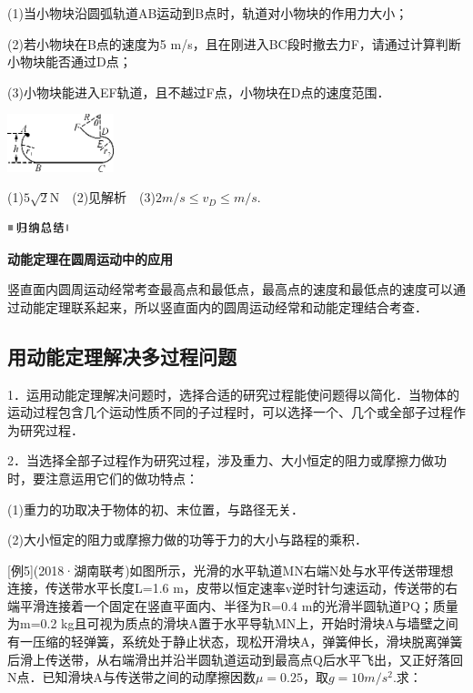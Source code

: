 \documentclass[cn,10.5pt,chinese,mac,chinesefont=founder]{elegantbook}
\begin{document}
(1)当小物块沿圆弧轨道AB运动到B点时，轨道对小物块的作用力大小；

(2)若小物块在B点的速度为5
m/s，且在刚进入BC段时撤去力F，请通过计算判断小物块能否通过D点；

(3)小物块能进入EF轨道，且不越过F点，小物块在D点的速度范围．

\begin{center}\includegraphics[width=1.21667in,height=0.66042in]{media/image226.png}\end{center}

\begin{solution}
	(1)$5 \sqrt{2} \mathrm{N}$　(2)见解析　(3)$2 m/s\leq v_D\leq  m/s$.
\end{solution}
\begin{center}\includegraphics[width=0.70764in,height=0.12292in]{media/image13.png}

\textbf{动能定理在圆周运动中的应用}
\end{center}


竖直面内圆周运动经常考查最高点和最低点，最高点的速度和最低点的速度可以通过动能定理联系起来，所以竖直面内的圆周运动经常和动能定理结合考查．


\subsection{用动能定理解决多过程问题}

1．运用动能定理解决问题时，选择合适的研究过程能使问题得以简化．当物体的运动过程包含几个运动性质不同的子过程时，可以选择一个、几个或全部子过程作为研究过程．

2．当选择全部子过程作为研究过程，涉及重力、大小恒定的阻力或摩擦力做功时，要注意运用它们的做功特点：

(1)重力的功取决于物体的初、末位置，与路径无关．

(2)大小恒定的阻力或摩擦力做的功等于力的大小与路程的乘积．

{[}例5{]}(2018·湖南联考)如图所示，光滑的水平轨道MN右端N处与水平传送带理想连接，传送带水平长度L=1.6
m，皮带以恒定速率v逆时针匀速运动，传送带的右端平滑连接着一个固定在竖直平面内、半径为R=0.4
m的光滑半圆轨道PQ；质量为m=0.2
kg且可视为质点的滑块A置于水平导轨MN上，开始时滑块A与墙壁之间有一压缩的轻弹簧，系统处于静止状态，现松开滑块A，弹簧伸长，滑块脱离弹簧后滑上传送带，从右端滑出并沿半圆轨道运动到最高点Q后水平飞出，又正好落回N点．已知滑块A与传送带之间的动摩擦因数$\mu=0.25$，取$g=10m/s^2$.求：
\end{document}
